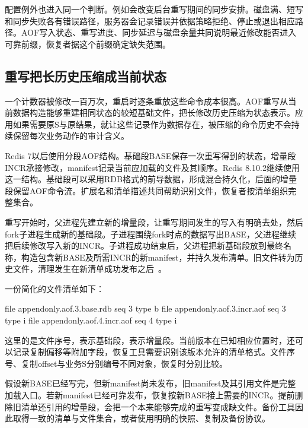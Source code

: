 配置例外也进入同一个判断。例如会改变后台重写期间的同步安排。磁盘满、短写和同步失败各有错误路径，服务器会记录错误并依据策略拒绝、停止或退出相应路径。AOF写入状态、重写进度、同步延迟与磁盘余量共同说明最近修改能否进入可靠前缀，恢复者据这个前缀确定缺失范围。

\subsection{重写把长历史压缩成当前状态}

一个计数器被修改一百万次，重启时逐条重放这些命令成本很高。AOF重写从当前数据构造能够重建相同状态的较短基础文件，把长修改历史压缩为状态表示。应用如果需要原S与原结果，就让这些记录作为数据存在，被压缩的命令历史不会持续保留每次业务动作的审计含义。

Redis 7以后使用分段AOF结构。基础段BASE保存一次重写得到的状态，增量段INCR承接修改，manifest记录当前应加载的文件及其顺序。Redis 8.10.2继续使用这一结构。基础段可以采用RDB格式的前导数据，形成混合持久化，后面的增量段保留AOF命令流。扩展名和清单描述共同帮助识别文件，恢复者按清单组织完整集合。


重写开始时，父进程先建立新的增量段，让重写期间发生的写入有明确去处，然后fork子进程生成新的基础段。子进程围绕fork时点的数据写出BASE，父进程继续把后续修改写入新的INCR。子进程成功结束后，父进程把新基础段放到最终名称，构造包含新BASE及所需INCR的新manifest，并持久发布清单。旧文件转为历史文件，清理发生在新清单成功发布之后~\cite{redis8102-source}。

一份简化的文件清单如下：

\begin{BookCode}
file appendonly.aof.3.base.rdb seq 3 type b
file appendonly.aof.3.incr.aof seq 3 type i
file appendonly.aof.4.incr.aof seq 4 type i
\end{BookCode}

这里的是文件序号，表示基础段，表示增量段。当前版本在已知相应位置时，还可以记录复制偏移等附加字段，恢复工具需要识别该版本允许的清单格式。文件序号、复制offset与业务S分别编号不同对象，恢复时分别比较。

假设新BASE已经写完，但新manifest尚未发布，旧manifest及其引用文件是完整加载入口。若新manifest已经可靠发布，恢复按新BASE接上需要的INCR。提前删除旧清单还引用的增量段，会把一个本来能够完成的重写变成缺文件。备份工具因此取得一致的清单与文件集合，或者使用明确的快照、复制及备份协议。

